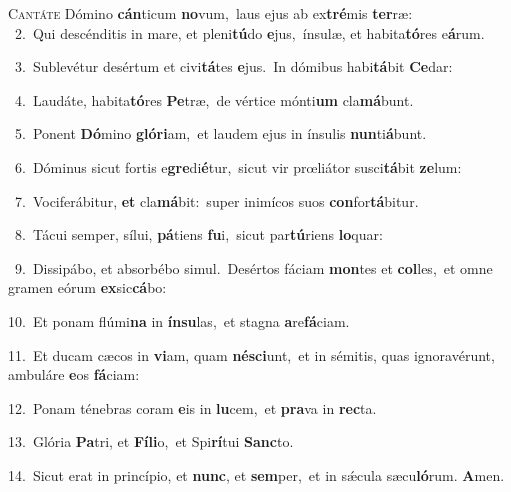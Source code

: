 \lettrine{\initial\textcolor{\initialcolor}{C}}{antáte} Dómino \textbf{cán}\-ticum \textbf{no}\-vum,~\star laus ejus ab ex\-\textbf{tré}\-mis \textbf{ter}\-ræ:\\
{\numbfont\textcolor{\numbcolor}{~2.}}~Qui descénditis in mare, et pleni\-\textbf{tú}\-do \textbf{e}\-jus,~\star ínsulæ, et habita\-\textbf{tó}\-res e\-\textbf{á}\-rum.\par
{\numbfont\textcolor{\numbcolor}{~3.}}~Sublevétur desértum et civi\-\textbf{tá}\-tes \textbf{e}\-jus.~\star In dómibus habi\-\textbf{tá}\-bit \textbf{Ce}\-dar:\par
{\numbfont\textcolor{\numbcolor}{~4.}}~Laudáte, habita\-\textbf{tó}\-res \textbf{Pe}\-træ,~\star de vértice mónti\textbf{um} cla\-\textbf{má}\-bunt.\par
{\numbfont\textcolor{\numbcolor}{~5.}}~Ponent \textbf{Dó}\-mino \textbf{gló}\-\textbf{ri}am,~\star et laudem ejus in ínsulis \textbf{nun}\-ti\-\textbf{á}\-bunt.\par
{\numbfont\textcolor{\numbcolor}{~6.}}~Dóminus sicut fortis e\-\textbf{gre}\-di\-\textbf{é}\-tur,~\star sicut vir prœliátor susci\-\textbf{tá}\-bit \textbf{ze}\-lum:\par
{\numbfont\textcolor{\numbcolor}{~7.}}~Vociferábitur, \textbf{et} cla\-\textbf{má}\-bit:~\star super inimícos suos \textbf{con}\-for\-\textbf{tá}\-bitur.\par
{\numbfont\textcolor{\numbcolor}{~8.}}~Tácui semper, sílui, \textbf{pá}\-tiens \textbf{fu}\-i,~\star sicut par\-\textbf{tú}\-riens \textbf{lo}\-quar:\par
{\numbfont\textcolor{\numbcolor}{~9.}}~Dissipábo, et absorbébo simul.~\dagger Desértos fáciam \textbf{mon}\-tes et \textbf{col}\-les,~\star et omne gramen eórum \textbf{ex}\-sic\-\textbf{cá}\-bo:\par
{\numbfont\textcolor{\numbcolor}{10.}}~Et ponam flúmi\textbf{na} in \textbf{ín}\-\textbf{su}las,~\star et stagna \textbf{a}\-re\-\textbf{fá}\-ciam.\par
{\numbfont\textcolor{\numbcolor}{11.}}~Et ducam cæcos in \textbf{vi}\-am, quam \textbf{né}\-\textbf{sci}unt,~\star et in sémitis, quas ignoravérunt, ambuláre \textbf{e}\-os \textbf{fá}\-ciam:\par
{\numbfont\textcolor{\numbcolor}{12.}}~Ponam ténebras coram \textbf{e}\-is in \textbf{lu}\-cem,~\star et \textbf{pra}\-va in \textbf{rec}\-ta.\par
{\numbfont\textcolor{\numbcolor}{13.}}~Glória \textbf{Pa}\-tri, et \textbf{Fí}\-\textbf{li}o,~\star et Spi\-\textbf{rí}\-tui \textbf{Sanc}\-to.\par
{\numbfont\textcolor{\numbcolor}{14.}}~Sicut erat in princípio, et \textbf{nunc}\-, et \textbf{sem}\-per,~\star et in sǽcula sæcu\-\textbf{ló}\-rum. \textbf{A}\-men.\par
